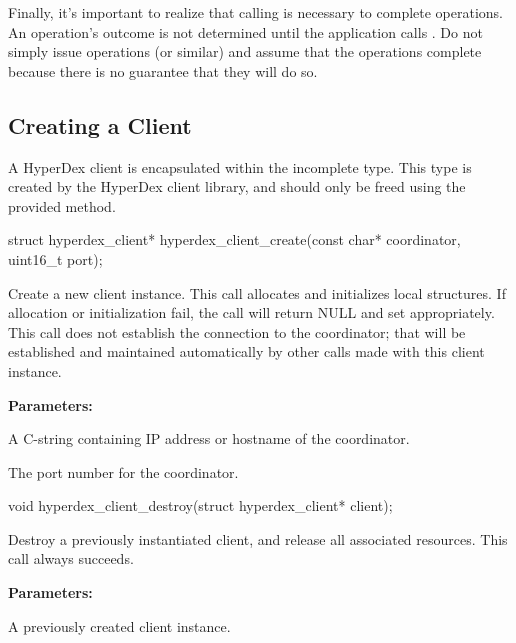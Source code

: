 Finally, it's important to realize that calling  is
necessary to complete operations.  An operation's outcome is not determined
until the application calls .  Do not simply issue
 operations (or similar) and assume that the
operations complete because there is no guarantee that they will do so.

\subsection{Creating a Client}

A HyperDex client is encapsulated within the incomplete  type.  This type is created by the HyperDex client library,
and should only be freed using the provided method.

\funcsep
\begin{ccode}
struct hyperdex_client*
hyperdex_client_create(const char* coordinator, uint16_t port);
\end{ccode}
\funcdesc Create a new client instance.  This call allocates and initializes
local structures.  If allocation or initialization fail, the call will return
NULL and set  appropriately.  This call does not establish the
connection to the coordinator; that will be established and maintained
automatically by other calls made with this client instance.

\noindent\textbf{Parameters:}
\begin{description}[labelindent=\widthof{{\code{coordinator}}},leftmargin=*,noitemsep,nolistsep,align=right]
\item[\code{coordinator}] A C-string containing IP address or hostname of the
    coordinator.
\item[\code{port}] The port number for the coordinator.
\end{description}

\funcsep
\begin{ccode}
void
hyperdex_client_destroy(struct hyperdex_client* client);
\end{ccode}
\funcdesc Destroy a previously instantiated client, and release all associated
resources.  This call always succeeds.

\noindent\textbf{Parameters:}
\begin{description}[labelindent=\widthof{{\code{client}}},leftmargin=*,noitemsep,nolistsep,align=right]
\item[\code{client}] A previously created client instance.
\end{description}

